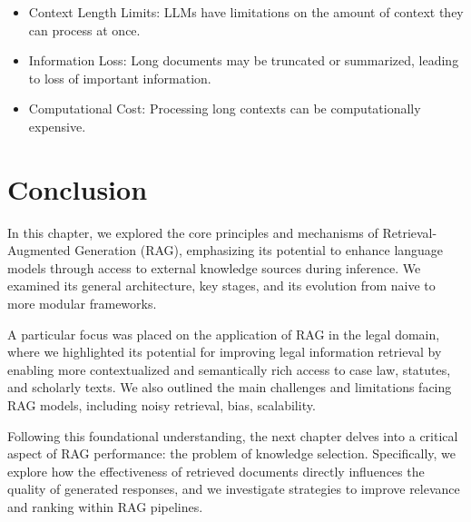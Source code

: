 \begin{itemize}
	\item Context Length Limits: LLMs have limitations on the amount of context they can process at once.
	\item Information Loss: Long documents may be truncated or summarized, leading to loss of important information.
	\item Computational Cost: Processing long contexts can be computationally expensive.
\end{itemize}
\newpage
\section{Conclusion}


In this chapter, we explored the core principles and mechanisms of Retrieval-Augmented Generation (RAG), emphasizing its potential to enhance language models through access to external knowledge sources during inference. We examined its general architecture, key stages, and its evolution from naive to more modular frameworks. 

A particular focus was placed on the application of RAG in the legal domain, where we highlighted its potential for improving legal information retrieval by enabling more contextualized and semantically rich access to case law, statutes, and scholarly texts. We also outlined the main challenges and limitations facing RAG models, including noisy retrieval, bias, scalability.

Following this foundational understanding, the next chapter delves into a critical aspect of RAG performance: the problem of knowledge selection. Specifically, we explore how the effectiveness of retrieved documents directly influences the quality of generated responses, and we investigate strategies to improve relevance and ranking within RAG pipelines.

